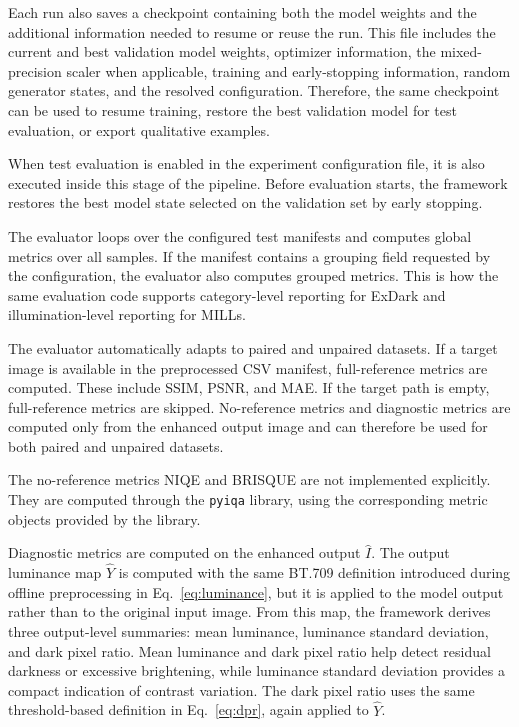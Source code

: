 Each run also saves a checkpoint containing both the model weights and the additional information needed to resume or reuse the run. This file includes the current and best validation model weights, optimizer information, the mixed-precision scaler when applicable, training and early-stopping information, random generator states, and the resolved configuration. Therefore, the same checkpoint can be used to resume training, restore the best validation model for test evaluation, or export qualitative examples.

When test evaluation is enabled in the experiment configuration file, it is also executed inside this stage of the pipeline. Before evaluation starts, the framework restores the best model state selected on the validation set by early stopping.

The evaluator loops over the configured test manifests and computes global metrics over all samples. If the manifest contains a grouping field requested by the configuration, the evaluator also computes grouped metrics. This is how the same evaluation code supports category-level reporting for ExDark and illumination-level reporting for MILLs.

The evaluator automatically adapts to paired and unpaired datasets. If a target image is available in the preprocessed CSV manifest, full-reference metrics are computed. These include SSIM, PSNR, and MAE. If the target path is empty, full-reference metrics are skipped. No-reference metrics and diagnostic metrics are computed only from the enhanced output image and can therefore be used for both paired and unpaired datasets.

The no-reference metrics NIQE and BRISQUE are not implemented explicitly. They are computed through the \texttt{pyiqa} library, using the corresponding metric objects provided by the library.

Diagnostic metrics are computed on the enhanced output $\hat{I}$. The output luminance map $\hat{Y}$ is computed with the same BT.709 definition introduced during offline preprocessing in Eq.~\ref{eq:luminance}, but it is applied to the model output rather than to the original input image. From this map, the framework derives three output-level summaries: mean luminance, luminance standard deviation, and dark pixel ratio. Mean luminance and dark pixel ratio help detect residual darkness or excessive brightening, while luminance standard deviation provides a compact indication of contrast variation. The dark pixel ratio uses the same threshold-based definition in Eq.~\ref{eq:dpr}, again applied to $\hat{Y}$.


